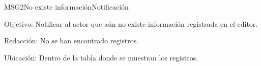 \begin{mensaje}{MSG2}{No existe información}{Notificación}
	\item [Objetivo:] Notificar al actor que aún no existe información registrada en el editor.
	\item[Redacción:] No se han encontrado registros.
	\item [Ubicación:] Dentro de la tabla donde se muestran los registros.
\end{mensaje}
